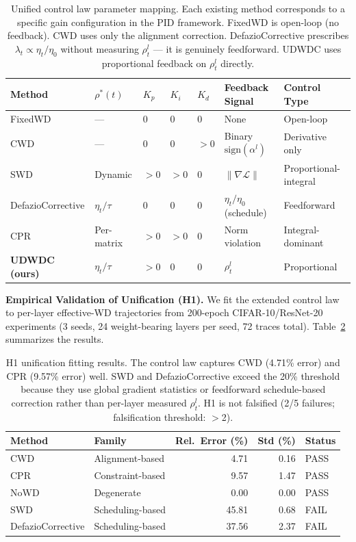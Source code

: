 \documentclass{article}
\begin{document}
\begin{table}[t]
\centering
\caption{Unified control law parameter mapping. Each existing method corresponds to a specific gain configuration in the PID framework. FixedWD is open-loop (no feedback). CWD uses only the alignment correction. DefazioCorrective prescribes $\lambda_t \propto \eta_t/\eta_0$ without measuring $\rho_t^l$ --- it is genuinely feedforward. UDWDC uses proportional feedback on $\rho_t^l$ directly.}
\label{tab:pid_mapping}
\begin{tabular}{lllllll}
\toprule
Method & $\rho^*(t)$ & $K_p$ & $K_i$ & $K_d$ & Feedback Signal & Control Type \\
\midrule
FixedWD & --- & 0 & 0 & 0 & None & Open-loop \\
CWD & --- & 0 & 0 & $>0$ & Binary $\text{sign}(\alpha^l)$ & Derivative only \\
SWD & Dynamic & $>0$ & $>0$ & 0 & $\|\nabla\mathcal{L}\|$ & Proportional-integral \\
DefazioCorrective & $\eta_t/\tau$ & 0 & 0 & 0 & $\eta_t/\eta_0$ (schedule) & Feedforward \\
CPR & Per-matrix & $>0$ & $>0$ & 0 & Norm violation & Integral-dominant \\
\textbf{UDWDC (ours)} & $\eta_t/\tau$ & $>0$ & 0 & 0 & $\rho_t^l$ & Proportional \\
\bottomrule
\end{tabular}
\end{table}

\textbf{Empirical Validation of Unification (H1).} We fit the extended control law to per-layer effective-WD trajectories from 200-epoch CIFAR-10/ResNet-20 experiments (3 seeds, 24 weight-bearing layers per seed, 72 traces total). Table~\ref{tab:h1_fitting} summarizes the results.

\begin{table}[t]
\centering
\caption{H1 unification fitting results. The control law captures CWD (4.71\% error) and CPR (9.57\% error) well. SWD and DefazioCorrective exceed the 20\% threshold because they use global gradient statistics or feedforward schedule-based correction rather than per-layer measured $\rho_t^l$. H1 is not falsified (2/5 failures; falsification threshold: $>$2).}
\label{tab:h1_fitting}
\begin{tabular}{llrr l}
\toprule
Method & Family & Rel.~Error (\%) & Std (\%) & Status \\
\midrule
CWD & Alignment-based & 4.71 & 0.16 & PASS \\
CPR & Constraint-based & 9.57 & 1.47 & PASS \\
NoWD & Degenerate & 0.00 & 0.00 & PASS \\
SWD & Scheduling-based & 45.81 & 0.68 & FAIL \\
DefazioCorrective & Scheduling-based & 37.56 & 2.37 & FAIL \\
\bottomrule
\end{tabular}
\end{table}
\end{document}
